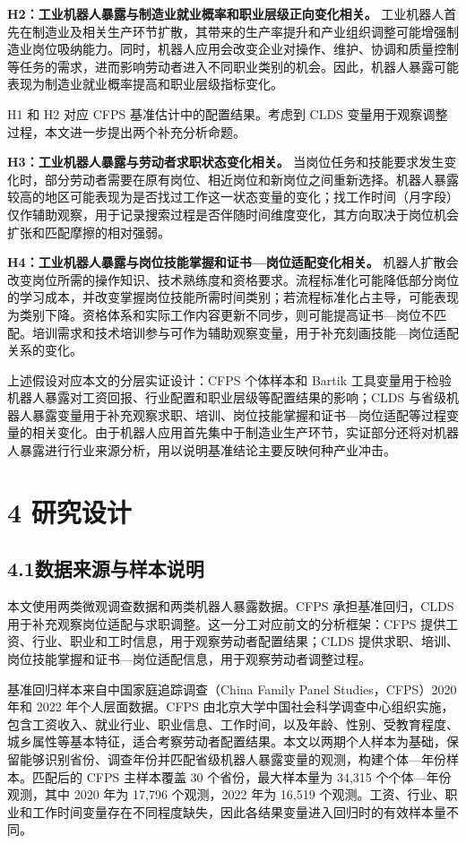 \textbf{H2：工业机器人暴露与制造业就业概率和职业层级正向变化相关。} 工业机器人首先在制造业及相关生产环节扩散，其带来的生产率提升和产业组织调整可能增强制造业岗位吸纳能力。同时，机器人应用会改变企业对操作、维护、协调和质量控制等任务的需求，进而影响劳动者进入不同职业类别的机会。因此，机器人暴露可能表现为制造业就业概率提高和职业层级指标变化。

H1 和 H2 对应 CFPS 基准估计中的配置结果。考虑到 CLDS 变量用于观察调整过程，本文进一步提出两个补充分析命题。

\textbf{H3：工业机器人暴露与劳动者求职状态变化相关。} 当岗位任务和技能要求发生变化时，部分劳动者需要在原有岗位、相近岗位和新岗位之间重新选择。机器人暴露较高的地区可能表现为是否找过工作这一状态变量的变化；找工作时间（月字段）仅作辅助观察，用于记录搜索过程是否伴随时间维度变化，其方向取决于岗位机会扩张和匹配摩擦的相对强弱。

\textbf{H4：工业机器人暴露与岗位技能掌握和证书---岗位适配变化相关。} 机器人扩散会改变岗位所需的操作知识、技术熟练度和资格要求。流程标准化可能降低部分岗位的学习成本，并改变掌握岗位技能所需时间类别；若流程标准化占主导，可能表现为类别下降。资格体系和实际工作内容更新不同步，则可能提高证书---岗位不匹配。培训需求和技术培训参与可作为辅助观察变量，用于补充刻画技能---岗位适配关系的变化。

上述假设对应本文的分层实证设计：CFPS 个体样本和 Bartik 工具变量用于检验机器人暴露对工资回报、行业配置和职业层级等配置结果的影响；CLDS 与省级机器人暴露变量用于补充观察求职、培训、岗位技能掌握和证书---岗位适配等过程变量的相关变化。由于机器人应用首先集中于制造业生产环节，实证部分还将对机器人暴露进行行业来源分析，用以说明基准结论主要反映何种产业冲击。

\section{4 研究设计}\label{ux7814ux7a76ux8bbeux8ba1}

\subsection{4.1数据来源与样本说明}\label{ux6570ux636eux6765ux6e90ux4e0eux6837ux672cux8bf4ux660e}

本文使用两类微观调查数据和两类机器人暴露数据。CFPS 承担基准回归，CLDS 用于补充观察岗位适配与求职调整。这一分工对应前文的分析框架：CFPS 提供工资、行业、职业和工时信息，用于观察劳动者配置结果；CLDS 提供求职、培训、岗位技能掌握和证书---岗位适配信息，用于观察劳动者调整过程。

基准回归样本来自中国家庭追踪调查（China Family Panel Studies，CFPS）2020 年和 2022 年个人层面数据。CFPS 由北京大学中国社会科学调查中心组织实施，包含工资收入、就业行业、职业信息、工作时间，以及年龄、性别、受教育程度、城乡属性等基本特征，适合考察劳动者配置结果。本文以两期个人样本为基础，保留能够识别省份、调查年份并匹配省级机器人暴露变量的观测，构建个体---年份样本。匹配后的 CFPS 主样本覆盖 30 个省份，最大样本量为 34,315 个个体---年份观测，其中 2020 年为 17,796 个观测，2022 年为 16,519 个观测。工资、行业、职业和工作时间变量存在不同程度缺失，因此各结果变量进入回归时的有效样本量不同。

